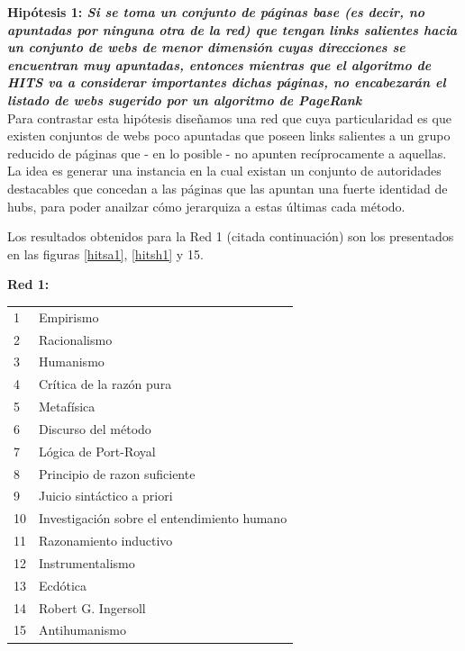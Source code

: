 \documentclass[a4paper]{article}
\begin{document}
\textbf{Hipótesis 1: \itshape{Si se toma un conjunto de páginas base (es decir, no apuntadas por ninguna otra de la red) que tengan links salientes hacia un conjunto de webs de menor dimensión cuyas direcciones se encuentran muy apuntadas, entonces mientras que el algoritmo de HITS va a considerar importantes dichas páginas, no encabezarán el listado de webs sugerido por un algoritmo de PageRank}}\\


Para contrastar esta hipótesis diseñamos una red que cuya particularidad es que existen conjuntos de webs poco apuntadas que poseen links salientes a un grupo reducido de páginas que - en lo posible - no apunten recíprocamente a aquellas. La idea es generar una instancia en la cual existan un conjunto de autoridades destacables  que concedan a las páginas que las apuntan una fuerte identidad de hubs, para poder anailzar cómo jerarquiza a estas últimas cada método.

Los resultados obtenidos para la Red 1  (citada continuación) son los presentados en las figuras \ref{hitsa1}, \ref{hitsh1} y 15.

\textbf{Red 1:}\\

\begin{tabular}{l l}
1 & Empirismo \\
2 & Racionalismo \\
3 & Humanismo \\
4 & Crítica de la razón pura \\
5 & Metafísica \\
6 & Discurso del método \\
7 & Lógica de Port-Royal \\
8 & Principio de razon suficiente \\
9 & Juicio sintáctico a priori \\
10 & Investigación sobre el entendimiento humano \\
11 & Razonamiento inductivo \\
12 & Instrumentalismo \\
13 & Ecdótica \\
14 & Robert G. Ingersoll \\
15 & Antihumanismo \\
\end{tabular}
\end{document}
